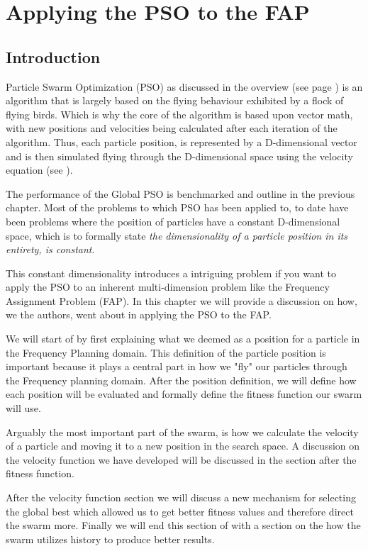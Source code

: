\chapter{Applying the PSO to the FAP}
\section{Introduction}
Particle Swarm Optimization (PSO) as discussed in the overview (see page \pageref{sec:PSO}) is an algorithm that is largely based on the flying behaviour exhibited by a flock of flying birds. Which is why the core
of the algorithm is based upon vector math, with new positions and velocities being calculated after each iteration of the algorithm. Thus, each particle position, is represented by a D-dimensional vector and
is then simulated flying through the D-dimensional space using the velocity equation (see \pageref{}).

The performance of the Global PSO is benchmarked and outline in the previous chapter. Most of the problems to which PSO has been applied to, to date have been problems where the position of particles have a 
constant D-dimensional space, which is to formally state \emph{the dimensionality of a particle position in its entirety, is constant}.

This constant dimensionality introduces a intriguing problem if you want to apply the PSO to an inherent multi-dimension problem like the Frequency Assignment Problem (FAP). In this chapter we will provide
a discussion on how, we the authors, went about in applying the PSO to the FAP.

We will start of by first explaining what we deemed as a position for a particle in the Frequency Planning domain. This definition of the particle position is important because it plays a central part in
how we "fly" our particles through the Frequency planning domain. After the position definition, we will define how each position will be evaluated and formally define the fitness function our swarm will use.

Arguably the most important part of the swarm, is how we calculate the velocity of a particle and moving it to a new position in the search space. A discussion on the velocity function we have 
developed will be discussed in the section after the fitness function.

After the velocity function section we will discuss a new mechanism for selecting the global best which allowed us to get better fitness values and therefore direct the swarm more. Finally we will end this section
of with a section on the how the swarm utilizes history to produce better results.
